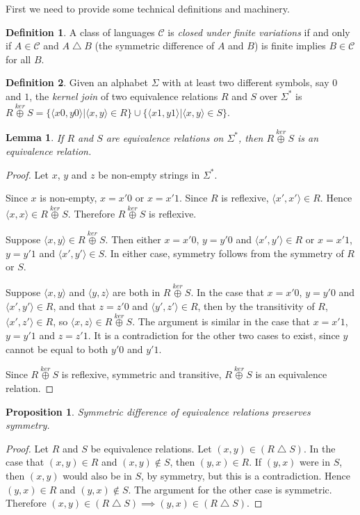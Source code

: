 \documentclass[draft]{article}
\newtheorem{lemma}[lemma]{Lemma}
\newtheorem{proposition}[proposition]{Proposition}
\theoremstyle{definition} \newtheorem{openproblem}[openproblem]{Open problem}
\theoremstyle{definition} \newtheorem{definition}[definition]{Definition}
\newcommand{\kj}{\overset{ker}{\oplus}} %
\newcommand{\symdiff}{\bigtriangleup} %
\newcommand{\defn}[1]{\emph{#1}} %
\newcommand{\pair}[2]{\langle#1,#2\rangle} %
\begin{document}
First we need to provide some technical definitions and machinery.

\begin{definition}
  A class of languages $\mathcal{C}$ is \defn{closed under finite variations} if and only if $A\in \mathcal{C}$ and $A\symdiff B$ (the symmetric difference of $A$ and $B$) is finite implies $B\in \mathcal{C}$ for all $B$.
\end{definition}

\begin{definition}
  Given an alphabet $\Sigma$ with at least two different symbols, say $0$ and $1$, the \defn{kernel join} of two equivalence relations $R$ and $S$ over $\Sigma^*$ is $R\kj S=\{\pair{x0}{y0}|\pair{x}{y}\in R\}\cup\{\pair{x1}{y1}|\pair{x}{y}\in S\}$.
\end{definition}

\begin{lemma}\label{lem:join}
  If $R$ and $S$ are equivalence relations on $\Sigma^*$, then $R\kj S$ is an equivalence relation.
\end{lemma}
\begin{proof}
  Let $x$, $y$ and $z$ be non-empty strings in $\Sigma^*$.
  
  Since $x$ is non-empty, $x=x'0$ or $x=x'1$.
  Since $R$ is reflexive, $\pair{x'}{x'}\in R$.
  Hence $\pair{x}{x}\in R\kj S$.
  Therefore $R\kj S$ is reflexive.
  
  Suppose $\pair{x}{y}\in R\kj S$.
  Then either $x=x'0$, $y=y'0$ and $\pair{x'}{y'}\in R$ or $x=x'1$, $y=y'1$ and $\pair{x'}{y'}\in S$.
  In either case, symmetry follows from the symmetry of $R$ or $S$.

  Suppose $\pair{x}{y}$ and $\pair{y}{z}$ are both in $R\kj S$.
  In the case that $x=x'0$, $y=y'0$ and $\pair{x'}{y'}\in R$, and that $z=z'0$ and $\pair{y'}{z'}\in R$, then by the transitivity of $R$, $\pair{x'}{z'}\in R$, so $\pair{x}{z}\in R\kj S$.
  The argument is similar in the case that $x=x'1$, $y=y'1$ and $z=z'1$.
  It is a contradiction for the other two cases to exist, since $y$ cannot be equal to both $y'0$ and $y'1$.

  Since $R\kj S$ is reflexive, symmetric and transitive, $R\kj S$ is an equivalence relation.
\end{proof}

\begin{proposition}\label{prop:symdiff}
  Symmetric difference of equivalence relations preserves symmetry.
\end{proposition}
\begin{proof}
  Let $R$ and $S$ be equivalence relations.
  Let $(x,y)\in(R\symdiff S)$.
  In the case that $(x,y)\in R$ and $(x,y)\notin S$, then $(y,x)\in R$.
  If $(y,x)$ were in $S$, then $(x,y)$ would also be in $S$, by symmetry, but this is a contradiction.
  Hence $(y,x)\in R$ and $(y,x)\notin S$.
  The argument for the other case is symmetric.
  Therefore $(x,y)\in(R\symdiff S)\implies (y,x)\in(R\symdiff S)$.
\end{proof}
\end{document}
